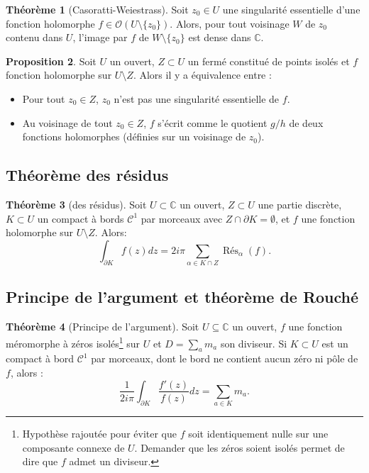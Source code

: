 \documentclass[11pt,a4paper]{article}
\newcommand{\C}{\mathbb{C}}
\theoremstyle{definition}
\newtheorem{theoreme}{Th\'eor\`eme}[section]
\newtheorem{proposition}[theoreme]{Proposition}
\theoremstyle{plain}
\begin{document}
\begin{theoreme}[Casoratti-Weiestrass]
Soit $z_0 \in U$ une singularité essentielle d'une fonction holomorphe $f \in \mathcal O(U\setminus \{z_0\})$.
Alors, pour tout voisinage $W$ de $z_0$ contenu dans $U$, l'image par $f$ de $W\setminus\{z_0\}$ est dense dans $\C$.
\end{theoreme}


\begin{proposition}
Soit $U$ un ouvert,  $Z\subset U$ un fermé constitué de points isolés et $f$ fonction holomorphe sur $U\setminus Z$.
Alors il y a équivalence entre :
\begin{itemize}
\item Pour tout $z_0\in Z$, $z_0$ n'est pas une singularité essentielle de $f$.
\item Au voisinage de tout $z_0\in Z$, $f$ s'écrit comme le quotient $g/h$ de deux fonctions holomorphes (définies sur un voisinage de $z_0$).
\end{itemize}
\end{proposition}


\subsection{Théorème des résidus}


\begin{theoreme}[des résidus]
Soit $U\subset \C$ un ouvert, $Z\subset U$ une partie discrète, $K\subset U$ un compact à bords $\mathcal C^1$ par morceaux avec $Z\cap \partial K = \emptyset$, et $f$ une fonction holomorphe sur $U\setminus Z$.
Alors:
\[ \int_{\partial K} f(z)dz = 2i\pi \sum_{\alpha \in K\cap Z} \operatorname{Rés}_\alpha(f).\]
\end{theoreme}



\subsection{Principe de l'argument et théorème de Rouché}



\begin{theoreme}[Principe de l'argument]
Soit $U\subseteq \C$ un ouvert, $f$ une fonction méromorphe à zéros isolés\footnote{Hypothèse rajoutée pour éviter que $f$ soit identiquement nulle sur une composante connexe de $U$. Demander que les zéros soient isolés permet de dire que $f$ admet un diviseur.} sur $U$ et $D = \sum_a m_a$ son diviseur.
Si $K\subset U$ est un compact à bord $\mathcal C^1$ par morceaux, dont le bord ne contient aucun zéro ni pôle de $f$, alors :
\[ \frac{1}{2i\pi} \int_{\partial K} \frac{f'(z)}{f(z)}dz = \sum_{a \in K} m_a.\]
\end{theoreme}
\end{document}
